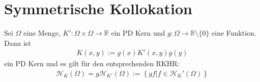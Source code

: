 \section{Symmetrische Kollokation}
\begin{theorem}
\label{thm:gewichtKern}
Sei $\Omega$ eine Menge, $K':\Omega \times \Omega \rightarrow \mathbb{R}$ ein \ac{PD} Kern und $g:\Omega \rightarrow \mathbb{R} \setminus \{0\}$ eine Funktion. Dann ist 
\begin{align*}
K(x,y) := g(x)K'(x,y)g(y)
\end{align*}
ein \gls{PD} Kern und es gilt für den entsprechenden \ac{RKHR}:
\begin{align*}
\mathcal{H}_{K}(\Omega) = g \mathcal{H}_{K'}(\Omega) := \left\{ gf|f \in \mathcal{H}_K'(\Omega)\right\}
\end{align*}
\end{theorem}
